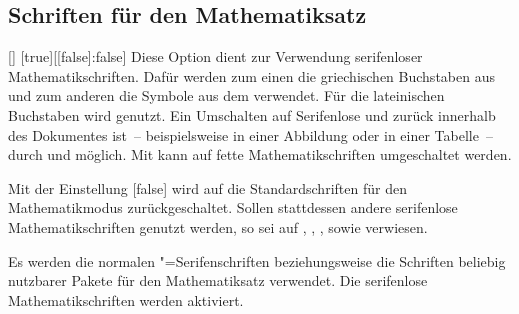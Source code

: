 \documentclass[%
  english,ngerman,%
  headings=optiontoheadandtoc,captions=tableheading,numbers=noenddot,%
  chapterpage,cdfoot,%
]{tudscrman}
\begin{document}
\subsection{Schriften für den Mathematiksatz}\label{sec:math}
%
%
%
\begin{Declaration}{[\PBoolean]}%
  [true][[false]:false]
\printdeclarationlist%
%
Diese Option dient zur Verwendung serifenloser Mathematikschriften. Dafür werden 
zum einen die griechischen Buchstaben aus  und zum anderen die 
Symbole aus dem  verwendet. Für die lateinischen Buchstaben 
wird \Univers genutzt. Ein Umschalten auf Serifenlose und zurück innerhalb des 
Dokumentes ist~-- beispielsweise in einer Abbildung oder in einer Tabelle~-- 
durch  und 
 möglich. Mit
 kann auf fette Mathematikschriften umgeschaltet werden.

Mit der Einstellung [false] wird auf die Standardschriften
für den Mathematikmodus zurückgeschaltet. Sollen stattdessen andere serifenlose 
Mathematikschriften genutzt werden, so sei auf , 
, ,  sowie 
 verwiesen.
%
\begin{values}
\itemfalse
  Es werden die normalen "=Serifenschriften beziehungsweise die 
  Schriften beliebig nutzbarer Pakete für den Mathematiksatz verwendet.
\itemtrue*
  Die serifenlose Mathematikschriften werden aktiviert.
\end{values}
\end{Declaration}
\end{document}
